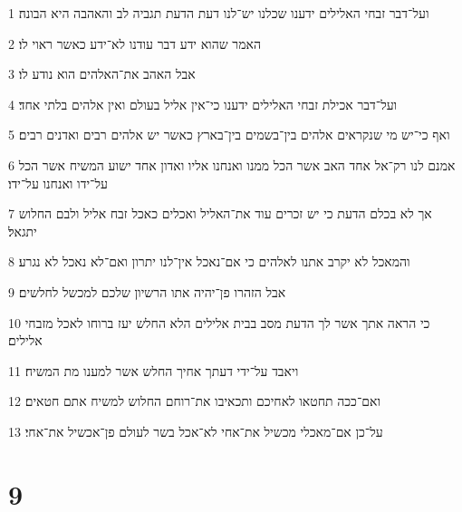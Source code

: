 \par 1 ועל־דבר זבחי האלילים ידענו שכלנו יש־לנו דעת הדעת תגביה לב והאהבה היא הבונה׃
\par 2 האמר שהוא ידע דבר עודנו לא־ידע כאשר ראוי לו׃
\par 3 אבל האהב את־האלהים הוא נודע לו׃
\par 4 ועל־דבר אכילת זבחי האלילים ידענו כי־אין אליל בעולם ואין אלהים בלתי אחד׃
\par 5 ואף כי־יש מי שנקראים אלהים בין־בשמים בין־בארץ כאשר יש אלהים רבים ואדנים רבים׃
\par 6 אמנם לנו רק־אל אחד האב אשר הכל ממנו ואנחנו אליו ואדון אחד ישוע המשיח אשר הכל על־ידו ואנחנו על־ידו׃
\par 7 אך לא בכלם הדעת כי יש זכרים עוד את־האליל ואכלים כאכל זבח אליל ולבם החלוש יתגאל׃
\par 8 והמאכל לא יקרב אתנו לאלהים כי אם־נאכל אין־לנו יתרון ואם־לא נאכל לא נגרע׃
\par 9 אבל הזהרו פן־יהיה אתו הרשיון שלכם למכשל לחלשים׃
\par 10 כי הראה אתך אשר לך הדעת מסב בבית אלילים הלא החלש יעז ברוחו לאכל מזבחי אלילים׃
\par 11 ויאבד על־ידי דעתך אחיך החלש אשר למענו מת המשיח׃
\par 12 ואם־ככה תחטאו לאחיכם ותכאיבו את־רוחם החלוש למשיח אתם חטאים׃
\par 13 על־כן אם־מאכלי מכשיל את־אחי לא־אכל בשר לעולם פן־אכשיל את־אחי׃

\chapter{9}

